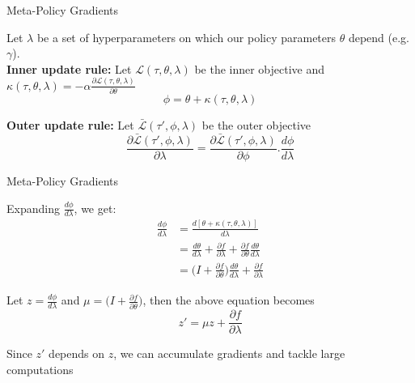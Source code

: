 \documentclass[aspectratio=169]{../latex_main/tntbeamer}  %
\begin{document}
\begin{frame}{Meta-Policy Gradients~}

    Let $\lambda$ be a set of hyperparameters on which our policy parameters $\theta$ depend (e.g. $\gamma$).\\

    \vfill
    \textbf{Inner update rule:} Let $\mathcal{L} (\tau, \theta, \lambda)$ be the inner objective and $\kappa(\tau, \theta, \lambda) = -\alpha \frac{\partial \mathcal{L} (\tau, \theta, \lambda)}{\partial \theta}$
    \[
        \phi = \theta + \kappa(\tau, \theta, \lambda)
    \]

    \vfill
    \textbf{Outer update rule:} Let $\bar{\mathcal{L}}(\tau', \phi, \lambda)$ be the outer objective
    \[
        \frac{\partial \bar{\mathcal{L}}(\tau', \phi, \lambda)}{\partial \lambda} =  \frac{\partial \bar{\mathcal{L}}(\tau', \phi, \lambda)}{\partial \phi} .  \frac{d \phi}{d \lambda}
    \]
    
\end{frame}

\begin{frame}{Meta-Policy Gradients~}

    Expanding $\frac{d \phi}{d \lambda}$, we get:
    \[
     \begin{split}
         \frac{d \phi}{d \lambda} & = \frac{d [\theta + \kappa(\tau, \theta, \lambda)]}{d \lambda} \\
         & = \frac{d \theta}{d\lambda} + \frac{\partial f}{\partial \lambda} + \frac{\partial f}{\partial \theta } \frac{d \theta}{ d \lambda} \\
          & = \big ( I + \frac{\partial f}{\partial \theta} \big ) \frac{d \theta}{d \lambda} + \frac{\partial f}{\partial \lambda}
    \end{split}
    \]

    \pause
    Let  $z =  \frac{d \phi}{d \lambda}$ and $\mu = ( I + \frac{\partial f}{\partial \theta} \big )$, then the above equation becomes
    \[
        z' = \mu z + \frac{\partial f}{\partial \lambda}
    \]

    \vfill
    Since $z'$ depends on $z$, we can accumulate gradients and tackle large computations\\
        
\end{frame}
\end{document}
